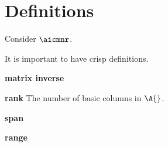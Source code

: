 \chapter{Definitions}
Consider $\aicmnr$.

It is important to have crisp definitions.

\noindent{}\textbf{matrix inverse}


\noindent{}\textbf{rank} The number of basic columns in $\A{}$.

\noindent{}\textbf{span}

\noindent{}\textbf{range}

\noindent{}\textbf{\ns}

\endinput